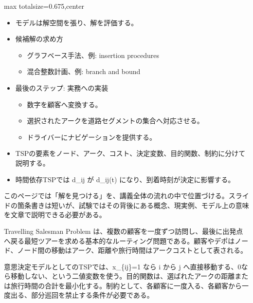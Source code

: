 \clearpage
{}
\begin{adjustbox}{max totalsize={\textwidth}{0.675\textheight},center}
\begin{minipage}{\textwidth}\scriptsize
\begin{minipage}[t]{0.485\textwidth}
\begin{itemize}
\item モデルは解空間を張り、解を評価する。
\item 候補解の求め方
\begin{itemize}
\item グラフベース手法、例: insertion procedures
\item 混合整数計画、例: branch and bound
\end{itemize}
\item 最後のステップ: 実務への実装
\begin{itemize}
\item 数字を顧客へ変換する。
\item 選択されたアークを道路セグメントの集合へ対応させる。
\item ドライバーにナビゲーションを提供する。
\end{itemize}
\end{itemize}
\begin{itemize}
\item TSPの要素をノード、アーク、コスト、決定変数、目的関数、制約に分けて説明する。
\item 時間依存TSPでは d\_ij が d\_ij(t) になり、到着時刻が決定に影響する。
\end{itemize}
\end{minipage}\hfill
\begin{minipage}[t]{0.485\textwidth}
このページでは「解を見つける」を、講義全体の流れの中で位置づける。スライドの箇条書きは短いが、試験ではその背後にある概念、現実例、モデル上の意味を文章で説明できる必要がある。\par
Travelling Salesman Problem は、複数の顧客を一度ずつ訪問し、最後に出発点へ戻る最短ツアーを求める基本的なルーティング問題である。顧客やデポはノード、ノード間の移動はアーク、距離や旅行時間はアークコストとして表される。\par
意思決定モデルとしてのTSPでは、x\_\{ij\}=1 なら i から j へ直接移動する、0なら移動しない、という二値変数を使う。目的関数は、選ばれたアークの距離または旅行時間の合計を最小化する。制約として、各顧客に一度入る、各顧客から一度出る、部分巡回を禁止する条件が必要である。\par

\end{minipage}
\end{minipage}
\end{adjustbox}
